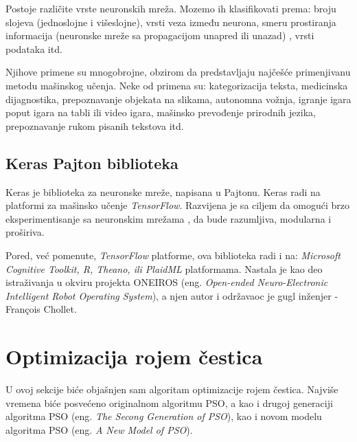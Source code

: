 \documentclass[a4paper]{article}
\begin{document}
{Postoje različite vrste neuronskih mreža. Mozemo ih klasifikovati prema: broju slojeva (jednoslojne i višeslojne), vrsti veza između neurona, smeru
prostiranja informacija (neuronske mreže sa propagacijom unapred ili unazad) \cite{website}, vrsti podataka itd. 

Njihove primene su mnogobrojne, obzirom da predstavljaju najčešće primenjivanu metodu mašinskog učenja. Neke od primena su: kategorizacija teksta,
medicinska dijagnostika, prepoznavanje objekata na slikama, autonomna vožnja, igranje igara poput igara na tabli ili video igara, mašinsko prevođenje
prirodnih jezika, prepoznavanje rukom pisanih tekstova itd. 

\subsection{Keras Pajton biblioteka}
\label{subsec:keras}

Keras je biblioteka za neuronske mreže, napisana u Pajtonu. Keras radi na platformi za mašinsko učenje  \textit{TensorFlow}. Razvijena je sa ciljem da omogući brzo eksperimentisanje sa neuronskim mrežama \cite{keraswebsite}, da bude razumljiva, modularna i proširiva.

Pored, već pomenute, \textit{TensorFlow} platforme, ova biblioteka radi i na: \textit{Microsoft Cognitive Toolkit, R, Theano, ili PlaidML} platformama. Nastala je kao deo istraživanja u okviru projekta ONEIROS (eng. \emph{Open-ended Neuro-Electronic Intelligent Robot Operating System}), a njen autor i održavaoc je gugl inženjer -  François Chollet.

\section{Optimizacija rojem čestica}
\label{subsec:pso}
U ovoj sekcije biće objašnjen sam algoritam optimizacije rojem čestica. Najviše vremena biće posvećeno originalnom algoritmu PSO, a kao i drugoj generaciji algoritma PSO (eng. \textit{The Secong Generation of PSO}), kao i novom modelu algoritma PSO 
(eng. \textit{A New Model of PSO}).


}
\end{document}

